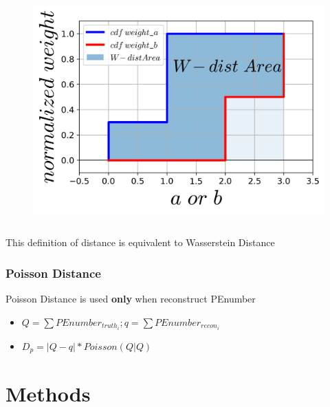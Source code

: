 \documentclass{beamer}
\begin{document}
\begin{frame}
\begin{columns}
\vspace{2mm}\begin{figure}
    \centering
    \includegraphics[width=1.0\linewidth]{img/ab.png}
\end{figure}
\end{columns}
This definition of distance is equivalent to Wasserstein Distance
\end{frame}

\begin{frame}
\frametitle{Poisson Distance}
\hspace{4mm}Poisson Distance is used \textbf{only} when reconstruct PEnumber
\begin{itemize}
    \item $Q = \sum PEnumber_{truth_i}; q = \sum PEnumber_{recon_i}$
    \item $D_{p} = |Q-q|*Poisson(Q|Q)$
\end{itemize}
\end{frame}

\section{Methods}
\end{document}
